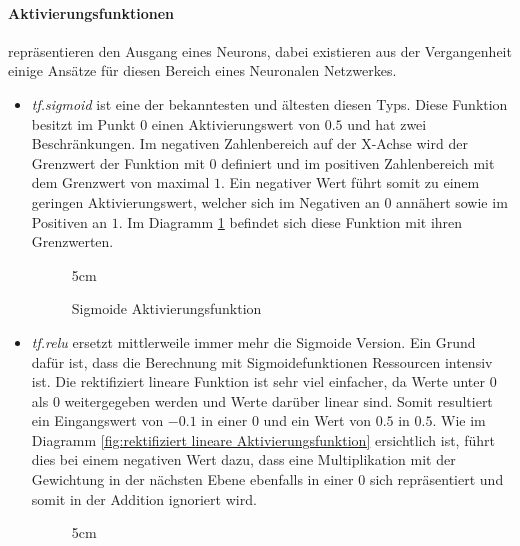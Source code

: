 \paragraph{Aktivierungsfunktionen} repräsentieren den Ausgang eines Neurons, dabei existieren aus der Vergangenheit einige Ansätze für diesen Bereich eines Neuronalen Netzwerkes. 
\begin{itemize}
	\item \textit{tf.sigmoid} ist eine der bekanntesten und ältesten diesen Typs.
	Diese Funktion besitzt im Punkt $0$ einen Aktivierungswert von $0.5$ und hat zwei Beschränkungen. 
	Im negativen Zahlenbereich auf der X-Achse wird der Grenzwert der Funktion mit $0$ definiert und im positiven Zahlenbereich mit dem Grenzwert von maximal $1$. 
	Ein negativer Wert führt somit zu einem geringen Aktivierungswert, welcher sich im Negativen an $0$ annähert sowie im Positiven an $1$.
	Im Diagramm \ref{fig:Sigmoide Aktivierungsfunktion} befindet sich diese Funktion mit ihren Grenzwerten. 
\begin{figure}[ht!]
	\centering
	 {5cm} {
	}
	\caption{Sigmoide Aktivierungsfunktion}
	\label{fig:Sigmoide Aktivierungsfunktion}
\end{figure}
	\item \textit{tf.relu} ersetzt mittlerweile immer mehr die Sigmoide Version. 
	Ein Grund dafür ist, dass die Berechnung mit Sigmoidefunktionen Ressourcen intensiv ist. 
	Die rektifiziert lineare Funktion ist sehr viel einfacher, da Werte unter $0$ als $0$ weitergegeben werden und Werte darüber linear sind. 
	Somit resultiert ein Eingangswert von $-0.1$ in einer $0$ und ein Wert von $0.5$ in $0.5$.
	Wie im Diagramm \ref{fig:rektifiziert lineare Aktivierungsfunktion} ersichtlich ist, führt dies bei einem negativen Wert dazu, dass eine Multiplikation mit der Gewichtung in der nächsten Ebene ebenfalls in einer $0$ sich repräsentiert und somit in der Addition ignoriert wird.
\begin{figure}[ht!]
	\centering
	\resizebox {!} {5cm} {
	}
\end{figure}
\end{itemize}
